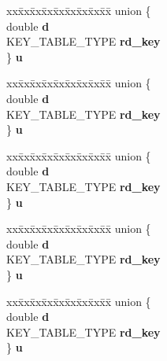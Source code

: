\begin{DoxyCompactItemize}
\begin{tabbing}
\end{tabbing}\item 
\mbox{\label{structcamellia__key__st_a81ef18935b7a56a659877d01b4e0367f}} 
\begin{tabbing}
xx\=xx\=xx\=xx\=xx\=xx\=xx\=xx\=xx\=\kill
union \{\\
\>double {\bfseries d}\\
\>KEY\_TABLE\_TYPE {\bfseries rd\_key}\\
\} {\bfseries u}\\

\end{tabbing}\item 
\mbox{\label{structcamellia__key__st_a2b10e57f91f7a10153442bdc12c29288}} 
\begin{tabbing}
xx\=xx\=xx\=xx\=xx\=xx\=xx\=xx\=xx\=\kill
union \{\\
\>double {\bfseries d}\\
\>KEY\_TABLE\_TYPE {\bfseries rd\_key}\\
\} {\bfseries u}\\

\end{tabbing}\item 
\mbox{\label{structcamellia__key__st_aee1f8cd10c269fdade8ccf8f023a4bed}} 
\begin{tabbing}
xx\=xx\=xx\=xx\=xx\=xx\=xx\=xx\=xx\=\kill
union \{\\
\>double {\bfseries d}\\
\>KEY\_TABLE\_TYPE {\bfseries rd\_key}\\
\} {\bfseries u}\\

\end{tabbing}\item 
\mbox{\label{structcamellia__key__st_a9a0df1a98d91dbdd11f503c5eb78bc79}} 
\begin{tabbing}
xx\=xx\=xx\=xx\=xx\=xx\=xx\=xx\=xx\=\kill
union \{\\
\>double {\bfseries d}\\
\>KEY\_TABLE\_TYPE {\bfseries rd\_key}\\
\} {\bfseries u}\\

\end{tabbing}\item 
\mbox{\label{structcamellia__key__st_af7d42f2abc2e4ed29f62a5d373759025}} 
\begin{tabbing}
xx\=xx\=xx\=xx\=xx\=xx\=xx\=xx\=xx\=\kill
union \{\\
\>double {\bfseries d}\\
\>KEY\_TABLE\_TYPE {\bfseries rd\_key}\\
\} {\bfseries u}\\


\end{tabbing}
\end{DoxyCompactItemize}
